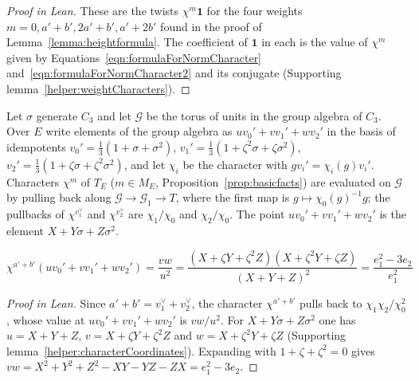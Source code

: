 \begin{proof}[Proof in Lean]

\leanok


These are the twists $\chi^m\mathbf 1$ for the four weights $m=0,a'+b',2a'+b',a'+2b'$ found in the proof of Lemma~\ref{lemma:heightformula}. The coefficient of $\mathbf 1$ in each is the value of $\chi^m$ given by Equations~\ref{eqn:formulaForNormCharacter} and~\ref{eqn:formulaForNormCharacter2} and its conjugate (Supporting lemma~\ref{helper:weightCharacters}).

\end{proof}

\begin{equationnode}

\label{eqn:formulaForNormCharacter}


\leanok

Let $\sigma$ generate $C_3$ and let $\mathcal G$ be the torus of units in the group algebra of $C_3$. Over $E$ write elements of the group algebra as $uv_0'+vv_1'+wv_2'$ in the basis of idempotents $v_0'=\tfrac13(1+\sigma+\sigma^2)$, $v_1'=\tfrac13(1+\zeta^2\sigma+\zeta\sigma^2)$, $v_2'=\tfrac13(1+\zeta\sigma+\zeta^2\sigma^2)$, and let $\chi_i$ be the character with $g v_i'=\chi_i(g)v_i'$. Characters $\chi^m$ of $T_E$ ($m\in M_E$, Proposition~\ref{prop:basicfacts}) are evaluated on $\mathcal G$ by pulling back along $\mathcal G\to\mathcal G_1\to T$, where the first map is $g\mapsto\chi_0(g)^{-1}g$; the pullbacks of $\chi^{v_1^\vee}$ and $\chi^{v_2^\vee}$ are $\chi_1/\chi_0$ and $\chi_2/\chi_0$. The point $uv_0'+vv_1'+wv_2'$ is the element $X+Y\sigma+Z\sigma^2$.

\begin{equation*} \chi^{a'+b'}(uv_0' + vv_1'+wv_2') = \frac{vw}{u^2} = \frac{(X+\zeta Y+\zeta^2 Z)(X+\zeta^2 Y+\zeta Z)}{(X+Y+Z)^2} = \frac{e_1^2-3e_2}{e_1^2} \end{equation*}

\end{equationnode}

\begin{proof}[Proof in Lean]

\leanok


Since $a'+b'=v_1^\vee+v_2^\vee$, the character $\chi^{a'+b'}$ pulls back to $\chi_1\chi_2/\chi_0^2$, whose value at $uv_0'+vv_1'+wv_2'$ is $vw/u^2$. For $X+Y\sigma+Z\sigma^2$ one has $u=X+Y+Z$, $v=X+\zeta Y+\zeta^2Z$ and $w=X+\zeta^2Y+\zeta Z$ (Supporting lemma~\ref{helper:characterCoordinates}). Expanding with $1+\zeta+\zeta^2=0$ gives $vw=X^2+Y^2+Z^2-XY-YZ-ZX=e_1^2-3e_2$.

\end{proof}

